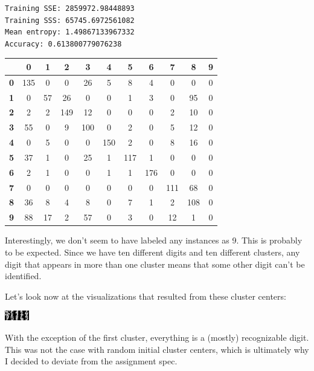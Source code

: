 \documentclass[11pt, oneside]{article}    %
\begin{document}
\begin{verbatim}
Training SSE: 2859972.98448893
Training SSS: 65745.6972561082
Mean entropy: 1.49867133967332
Accuracy: 0.613800779076238
\end{verbatim}

\begin{center}
	\begin{tabular}{|c|c|c|c|c|c|c|c|c|c|c|}
		\hline
		& \textbf{0} & \textbf{1} & \textbf{2} & \textbf{3} & \textbf{4} & \textbf{5} & \textbf{6} & \textbf{7} & \textbf{8} & \textbf{9} \\ \hline
		\textbf{0} & 135 & 0 & 0 & 26 & 5 & 8 & 4 & 0 & 0 & 0 \\ \hline
		\textbf{1} & 0 & 57 & 26 & 0 & 0 & 1 & 3 & 0 & 95 & 0 \\ \hline
		\textbf{2} & 2 & 2 & 149 & 12 & 0 & 0 & 0 & 2 & 10 & 0 \\ \hline
		\textbf{3} & 55 & 0 & 9 & 100 & 0 & 2 & 0 & 5 & 12 & 0 \\ \hline
		\textbf{4} & 0 & 5 & 0 & 0 & 150 & 2 & 0 & 8 & 16 & 0 \\ \hline
		\textbf{5} & 37 & 1 & 0 & 25 & 1 & 117 & 1 & 0 & 0 & 0 \\ \hline
		\textbf{6} & 2 & 1 & 0 & 0 & 1 & 1 & 176 & 0 & 0 & 0 \\ \hline
		\textbf{7} & 0 & 0 & 0 & 0 & 0 & 0 & 0 & 111 & 68 & 0 \\ \hline
		\textbf{8} & 36 & 8 & 4 & 8 & 0 & 7 & 1 & 2 & 108 & 0 \\ \hline
		\textbf{9} & 88 & 17 & 2 & 57 & 0 & 3 & 0 & 12 & 1 & 0 \\ \hline
	\end{tabular}
\end{center}

Interestingly, we don't seem to have labeled any instances as 9. This is probably to be expected. Since we have ten different digits and ten different clusters, any digit that appears in more than one cluster means that some other digit can't be identified.

Let's look now at the visualizations that resulted from these cluster centers:
\begin{center}
	\includegraphics{Exp1Visualizations}
\end{center}

With the exception of the first cluster, everything is a (mostly) recognizable digit. This was not the case with random initial cluster centers, which is ultimately why I decided to deviate from the assignment spec.
\end{document}
